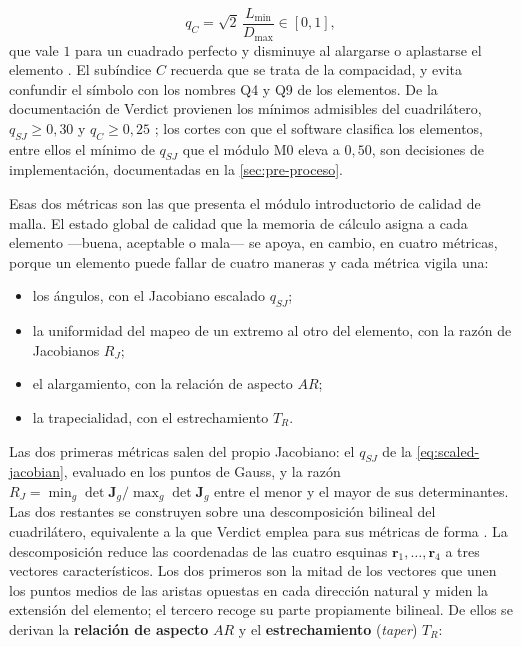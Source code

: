 \begin{equation}
q_C = \sqrt{2}\,\frac{L_{\min}}{D_{\max}} \in [0, 1],
\label{eq:stretch}
\end{equation}
que vale $1$ para un cuadrado perfecto y disminuye al alargarse o aplastarse el elemento \autocite[p.~57]{stimpson2007verdict}. El subíndice $C$ recuerda que se trata de la compacidad, y evita confundir el símbolo con los nombres Q4 y Q9 de los elementos. De la documentación de Verdict provienen los mínimos admisibles del cuadrilátero, $q_{SJ} \ge 0{,}30$ y $q_C \ge 0{,}25$ \autocite[pp.~51, 57]{stimpson2007verdict}; los cortes con que el software clasifica los elementos, entre ellos el mínimo de $q_{SJ}$ que el módulo M0 eleva a $0{,}50$, son decisiones de implementación, documentadas en la \autoref{sec:pre-proceso}.

Esas dos métricas son las que presenta el módulo introductorio de calidad de malla. El estado global de calidad que la memoria de cálculo asigna a cada elemento —buena, aceptable o mala— se apoya, en cambio, en cuatro métricas, porque un elemento puede fallar de cuatro maneras y cada métrica vigila una:

\begin{itemize}
    \item los ángulos, con el Jacobiano escalado $q_{SJ}$;
    \item la uniformidad del mapeo de un extremo al otro del elemento, con la razón de Jacobianos $R_J$;
    \item el alargamiento, con la relación de aspecto $AR$;
    \item la trapecialidad, con el estrechamiento $T_R$.
\end{itemize}

Las dos primeras métricas salen del propio Jacobiano: el $q_{SJ}$ de la \autoref{eq:scaled-jacobian}, evaluado en los puntos de Gauss, y la razón $R_J = \min_g \det\bm{J}_g / \max_g \det\bm{J}_g$ entre el menor y el mayor de sus determinantes. Las dos restantes se construyen sobre una descomposición bilineal del cuadrilátero, equivalente a la que Verdict emplea para sus métricas de forma \autocite[pp.~35-36]{stimpson2007verdict}. La descomposición reduce las coordenadas de las cuatro esquinas $\bm{r}_1,\dots,\bm{r}_4$ a tres vectores característicos. Los dos primeros son la mitad de los vectores que unen los puntos medios de las aristas opuestas en cada dirección natural y miden la extensión del elemento; el tercero recoge su parte propiamente bilineal. De ellos se derivan la \textbf{relación de aspecto} $AR$ y el \textbf{estrechamiento} (\emph{taper}) $T_R$:


